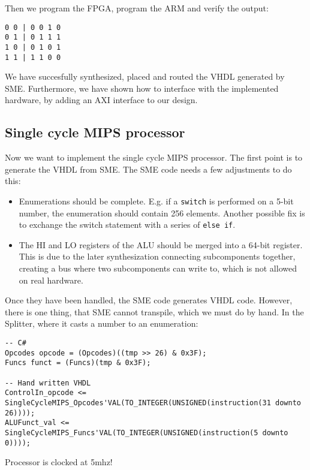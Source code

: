 Then we program the FPGA, program the ARM and verify the output:
\begin{lstlisting}
0 0 | 0 0 1 0
0 1 | 0 1 1 1
1 0 | 0 1 0 1
1 1 | 1 1 0 0
\end{lstlisting}
We have succesfully synthesized, placed and routed the VHDL generated by SME.
Furthermore, we have shown how to interface with the implemented hardware, by
adding an AXI interface to our design.

\subsection{Single cycle MIPS processor}
Now we want to implement the single cycle MIPS processor. The first point is to
generate the VHDL from SME. The SME code needs a few adjustments to do this:
\begin{itemize}
    \item Enumerations should be complete. E.g. if a \texttt{switch} is
        performed on a 5-bit number, the enumeration should contain 256
        elements. Another possible fix is to exchange the switch statement with
        a series of \texttt{else if}.

    \item The HI and LO registers of the ALU should be merged into a 64-bit
        register. This is due to the later synthesization connecting
        subcomponents together, creating a bus where two subcomponents can
        write to, which is not allowed on real hardware.
\end{itemize}
Once they have been handled, the SME code generates VHDL code. However, there is
one thing, that SME cannot transpile, which we must do by hand. In the Splitter,
where it casts a number to an enumeration:
\begin{lstlisting}
-- C#
Opcodes opcode = (Opcodes)((tmp >> 26) & 0x3F);
Funcs funct = (Funcs)(tmp & 0x3F);

-- Hand written VHDL
ControlIn_opcode <= SingleCycleMIPS_Opcodes'VAL(TO_INTEGER(UNSIGNED(instruction(31 downto 26))));
ALUFunct_val <= SingleCycleMIPS_Funcs'VAL(TO_INTEGER(UNSIGNED(instruction(5 downto 0))));
\end{lstlisting}

Processor is clocked at 5mhz!
